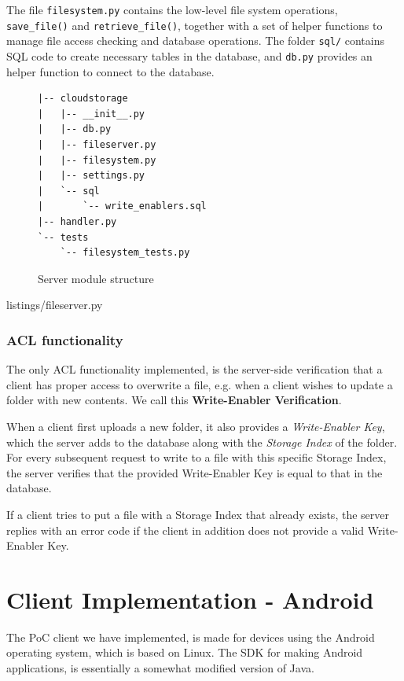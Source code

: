 \documentclass[pdftex,english,10pt,b5paper,twoside]{book}
\begin{document}
The file \texttt{filesystem.py} contains the low-level file system operations,
\texttt{save\_file()} and \texttt{retrieve\_file()}, together with a set of
helper functions to manage file access checking and database operations.  The
folder \texttt{sql/} contains \ac{SQL} code to create necessary tables in the
database, and \texttt{db.py} provides an helper function to connect to the
database.

\begin{figure}[h!]
\begin{verbatim}
|-- cloudstorage
|   |-- __init__.py
|   |-- db.py
|   |-- fileserver.py
|   |-- filesystem.py
|   |-- settings.py
|   `-- sql
|       `-- write_enablers.sql
|-- handler.py
`-- tests
    `-- filesystem_tests.py
\end{verbatim}
    \caption{Server module structure}
    \label{fig:IM:layout}
\end{figure}


{listings/fileserver.py}

\subsubsection{\acs{ACL} functionality}

The only \ac{ACL} functionality implemented, is the server-side verification
that a client has proper access to overwrite a file, e.g. when a client wishes
to update a folder with new contents. We call this \textbf{Write-Enabler
Verification}.

When a client first uploads a new folder, it also provides a
\emph{Write-Enabler Key}, which the server adds to the database along with the
\emph{Storage Index} of the folder.  For every subsequent request to write to a
file with this specific Storage Index, the server verifies that the provided
Write-Enabler Key is equal to that in the database.

If a client tries to put a file with a Storage Index that already exists, the
server replies with an error code if the client in addition does not provide a
valid Write-Enabler Key.

\section{Client Implementation - Android}

The \ac{PoC} client we have implemented, is made for devices using the Android
operating system, which is based on Linux. The \ac{SDK} for making Android
applications, is essentially a somewhat modified version of Java.
\end{document}
